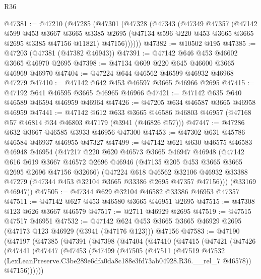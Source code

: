 \begin{lexlean}{R36}
\begin{coremodule}
@47381 := @47210
    (@47285
      (@47301
        (@47328
          (@47343
            (@47349
              @47357
              (@47142
                @599
                @453
                @3667
                @3665
                @3385
                @2695
                (@47134 @596 @220 @453 @3665 @3665 @2695 @3385 @47156 @11821)
                @47156))))))
@47382 := @10502 @195
@47385 := @47203 (@47381 (@47382 @46943))
@47391 := @47142 @646 @453 @46602 @3665 @46970 @2695
@47398 := @47134 @609 @220 @645 @46600 @3665 @46969 @46970
@47404 := @47224 @644 @46562 @46599 @46932 @46968 @47279
@47410 := @47142 @642 @453 @46597 @3665 @46966 @2695
@47415 := @47192 @641 @46595 @3665 @46965 @46966
@47421 := @47142 @635 @640 @46589 @46594 @46959 @46964
@47426 := @47205 @634 @46587 @3665 @46958 @46959
@47441 := @47142
    @612
    @633
    @3665
    @46586
    @46803
    @46957
    (@47168 @57 @46814 @34 @46803 @47179 (@3941 (@46826 @57)))
@47447 := @47286 @632 @3667 @46585 @3933 @46956 @47300
@47453 := @47302 @631 @45786 @46584 @46937 @46955 @47327
@47499 := @47142
    @621
    @630
    @46575
    @46583
    @46948
    @46954
    (@47217
      @220
      @620
      @46573
      @3665
      @46947
      @46948
      (@47142
        @616
        @619
        @3667
        @46572
        @2696
        @46946
        (@47135 @205 @453 @3665 @3665 @2695 @2696 @47156 @32666)
        (@47224
          @618
          @46562
          @32106
          @46932
          @33388
          @47279
          (@47344 @453 @32104 @3665 @33386 @2695 @47357 @47156)))
      (@33169 @46947))
@47505 := @47344 @629 @32104 @46582 @33386 @46953 @47357
@47511 := @47142 @627 @453 @46580 @3665 @46951 @2695
@47515 := @47308 @123 @626 @3667 @46579
@47517 := @2711 @46929 @2695
@47519 := @47515 @47517 @46951
@47532 := @47142
    @624
    @453
    @3665
    @3665
    @46929
    @2695
    (@47173 @123 @46929 (@3941 (@47176 @123)))
    @47156
@47583 := @47190
    (@47197
      (@47385
        (@47391
          (@47398
            (@47404
              (@47410
                (@47415
                  (@47421
                    (@47426
                      (@47441
                        (@47447
                          (@47453
                            (@47499
                              (@47505
                                (@47511
                                  (@47519
                                    @47532
                                    (LexLeanPreserve.C3be289e6dfa0da8c188e3fd73ab04928.R36.__rel_7
                                      @46578))
                                  @47156))))))

\end{coremodule}
\end{lexlean}
